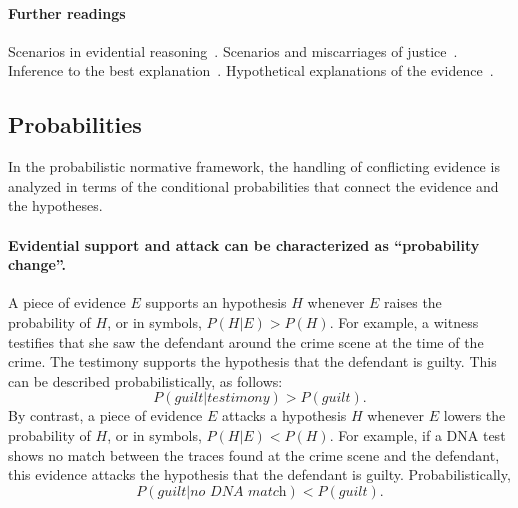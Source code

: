 \documentclass[10pt]{article}
\begin{document}


\paragraph{Further readings} 
Scenarios in evidential reasoning~\citep{bennettFeldman1981,penningtonHastie1993,penningtonHastie1993StoryModel}. Scenarios and miscarriages of justice~\citep{wagenaarEtal1993}. Inference to the best explanation~\citep{pardoAllen2008}. Hypothetical explanations of the evidence~\citep{thagard1989}. 

\subsection{Probabilities}

In the probabilistic normative framework, the handling of conflicting evidence is analyzed in terms of the conditional probabilities that connect the evidence and the hypotheses.

\paragraph{Evidential support and attack can be characterized as ``probability change''.} 
A piece of evidence $E$ supports an 
hypothesis $H$ whenever $E$ raises the probability of $H$, or in symbols, 
$P(H|E) > P(H)$. 
For example, a witness 
testifies that she saw the defendant around the crime scene
 at the time of the crime. The testimony supports the hypothesis 
 that the defendant is guilty. 
This can be described probabilistically, as follows:
 \[ P(\textit{guilt}|\textit{testimony}) > P(\textit{guilt}).\] 
By contrast, a piece of evidence $E$ attacks a hypothesis $H$ whenever $E$ lowers 
the probability of $H$, or in symbols, $P(H|E) < P(H)$.
For example, if a DNA test shows no match between the traces found at the crime
 scene and the defendant, this evidence attacks the hypothesis that the defendant is guilty. 
 Probabilistically, 
%
\[ P(\textit{guilt}|\textit{no DNA match}) < P(\textit{guilt}).\]  
%
 
\end{document}
